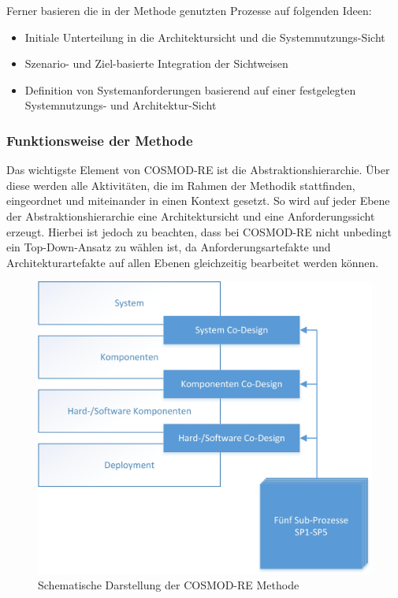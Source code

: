 Ferner basieren die in der Methode genutzten Prozesse auf folgenden Ideen: \cite{Poh01} \\

\begin{itemize}
\item Initiale Unterteilung in die Architektursicht und die Systemnutzungs-Sicht
\item Szenario- und Ziel-basierte Integration der Sichtweisen
\item Definition von Systemanforderungen basierend auf einer festgelegten Systemnutzungs- und Architektur-Sicht \\
\end{itemize}

\subsubsection{Funktionsweise der Methode}
Das wichtigste Element von COSMOD-RE ist die Abstraktionshierarchie. \"Uber diese werden alle Aktivit\"aten, die im Rahmen der Methodik stattfinden, eingeordnet und miteinander in einen Kontext gesetzt. So wird auf jeder Ebene der Abstraktionshierarchie eine Architektursicht und eine Anforderungssicht erzeugt. Hierbei ist jedoch zu beachten, dass bei COSMOD-RE nicht unbedingt ein Top-Down-Ansatz zu w\"ahlen ist, da Anforderungsartefakte und Architekturartefakte auf allen Ebenen gleichzeitig bearbeitet werden k\"onnen.\\

\begin{figure}[h]
	\centering
	\includegraphics[scale=0.75]{COSMODREoverview.jpg} 
	\caption{Schematische Darstellung der COSMOD-RE Methode}\label{cosmodreow}
\end{figure}

